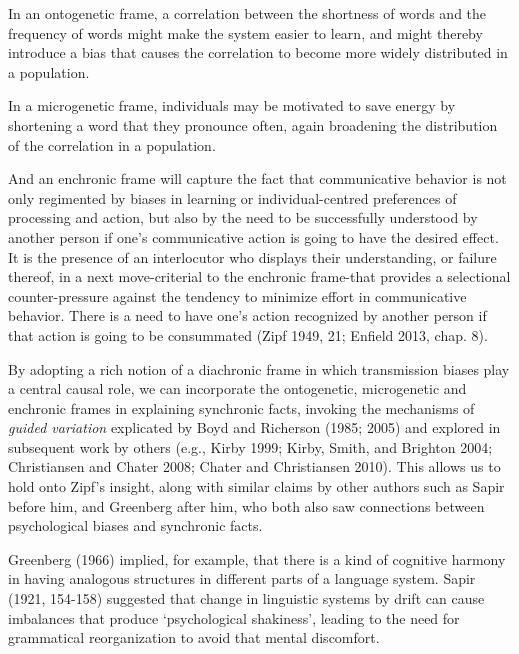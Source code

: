 In an ontogenetic frame, a correlation between the shortness of words 
and the frequency of words might make the system easier to learn, and 
might thereby introduce a bias that causes the correlation to become 
more widely distributed in a population. 



In a microgenetic frame, individuals may be motivated to save energy by 
shortening a word that they pronounce often, again broadening the 
distribution of the correlation in a population. 



And an enchronic frame will capture the fact that communicative behavior 
is not only regimented by biases in learning or individual-centred 
preferences of processing and action, but also by the need to be 
successfully understood by another person if one's communicative action 
is going to have the desired effect. It is the presence of an 
interlocutor who displays their understanding, or failure thereof, in a 
next move-criterial to the enchronic frame-that provides a selectional 
counter-pressure against the tendency to minimize effort in 
communicative behavior. There is a need to have one's action recognized 
by another person if that action is going to be consummated (Zipf 1949, 
21; Enfield 2013, chap. 8). 



By adopting a rich notion of a diachronic frame in which transmission 
biases play a central causal role, we can incorporate the ontogenetic, 
microgenetic and enchronic frames in explaining synchronic facts, 
invoking the mechanisms of \textit{guided variation} explicated by 
Boyd and Richerson (1985; 2005) and explored in subsequent work by 
others (e.g., Kirby 1999; Kirby, Smith, and Brighton 2004; Christiansen 
and Chater 2008; Chater and Christiansen 2010). This allows us to hold 
onto Zipf's insight, along with similar claims by other authors such as 
Sapir before him, and Greenberg after him, who both also saw connections 
between psychological biases and synchronic facts. 



Greenberg (1966) implied, for example, that there is a kind of cognitive 
harmony in having analogous structures in different parts of a language 
system. Sapir (1921, 154-158) suggested that change in linguistic 
systems by drift can cause imbalances that produce \textquoteleft psychological 
shakiness', leading to the need for grammatical reorganization to avoid 
that mental discomfort. 



